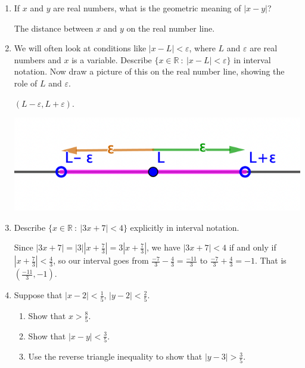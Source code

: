 \documentclass[12pt]{amsart}
\def\e{\varepsilon}
\newcommand{\R}{{\mathbb{R}}}
\numberwithin{equation}{section}
\theoremstyle{plain} %
\theoremstyle{definition}
\theoremstyle{remark}
\begin{document}
\begin{enumerate}

\item If $x$ and $y$ are real numbers, what is the geometric meaning of $|x-y|$?

\begin{framed} The distance between $x$ and $y$ on the real number line.
\end{framed}

\item We will often look at conditions like $|x-L|<\varepsilon$, where $L$ and $\varepsilon$ are real numbers and $x$ is a variable. Describe $\{ x \in \R \ :  \ |x-L|<\varepsilon\}$ in interval notation. Now draw a picture of this on the real number line, showing the role of $L$ and $\varepsilon$.

\begin{framed} 
$(L-\e, L+\e)$.

\includegraphics[scale=.5]{ws8p1.png}
\end{framed}

\item Describe $\{ x \in \R \ :  \ |3x+7|<4 \}$ explicitly in interval notation.

\begin{framed}
Since $|3x+7| = |3| |x+ \frac{7}{3}| = 3 |x+\frac{7}{3}|$, we have $|3x+7|<4$ if and only if $|x+\frac{7}{3}|< \frac{4}{3}$, so our interval goes from $\frac{-7}{3} - \frac{4}{3} = \frac{-11}{3}$ to $\frac{-7}{3} + \frac{4}{3} = -1$. That is
$(\frac{-11}{3}, -1)$.
\end{framed}

\item Suppose that $|x-2|< \frac{1}{5}$, $|y-2|< \frac{2}{5}$.

\begin{enumerate}
\item Show that $x > \frac{8}{5}$.
\item Show that $|x-y| < \frac{3}{5}$.
\item Use the reverse triangle inequality to show that $|y-3|>\frac{3}{5}$.
\end{enumerate}


\end{enumerate}
\end{document}
